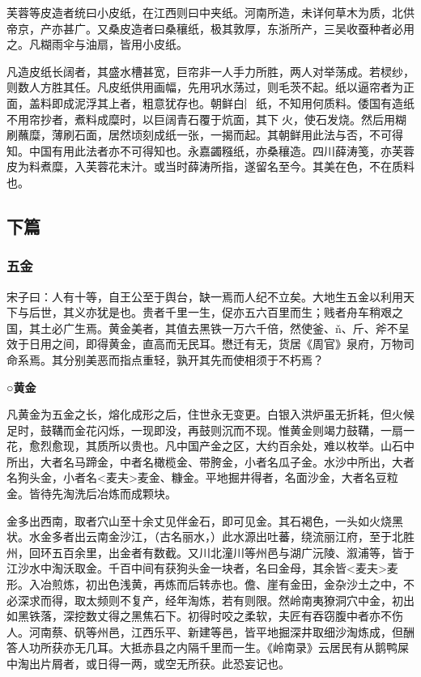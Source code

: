 \documentclass[]{article}
\begin{document}
芙蓉等皮造者统曰小皮纸，在江西则曰中夹纸。河南所造，未详何草木为质，北供帝京，产亦甚广。又桑皮造者曰桑穰纸，极其敦厚，东浙所产，三吴收蚕种者必用之。凡糊雨伞与油扇，皆用小皮纸。

凡造皮纸长阔者，其盛水槽甚宽，巨帘非一人手力所胜，两人对举荡成。若棂纱，则数人方胜其任。凡皮纸供用画幅，先用巩水荡过，则毛茨不起。纸以逼帘者为正面，盖料即成泥浮其上者，粗意犹存也。朝鲜白︴纸，不知用何质料。倭国有造纸不用帘抄者，煮料成糜时，以巨阔青石覆于炕面，其下火，使石发烧。然后用糊刷蘸糜，薄刷石面，居然顷刻成纸一张，一揭而起。其朝鲜用此法与否，不可得知。中国有用此法者亦不可得知也。永嘉蠲糨纸，亦桑穰造。四川薛涛笺，亦芙蓉皮为料煮糜，入芙蓉花末汁。或当时薛涛所指，遂留名至今。其美在色，不在质料也。

\hypertarget{header-n2655}{%
\subsection{下篇}\label{header-n2655}}

\hypertarget{header-n2657}{%
\subsubsection{五金}\label{header-n2657}}

宋子曰：人有十等，自王公至于舆台，缺一焉而人纪不立矣。大地生五金以利用天下与后世，其义亦犹是也。贵者千里一生，促亦五六百里而生；贱者舟车稍艰之国，其土必广生焉。黄金美者，其值去黑铁一万六千倍，然使釜、ň、斤、斧不呈效于日用之间，即得黄金，直高而无民耳。懋迁有无，货居《周官》泉府，万物司命系焉。其分别美恶而指点重轻，孰开其先而使相须于不朽焉？

\textbf{○黄金}

凡黄金为五金之长，熔化成形之后，住世永无变更。白银入洪炉虽无折耗，但火候足时，鼓鞲而金花闪烁，一现即没，再鼓则沉而不现。惟黄金则竭力鼓鞲，一扇一花，愈烈愈现，其质所以贵也。凡中国产金之区，大约百余处，难以枚举。山石中所出，大者名马蹄金，中者名橄榄金、带胯金，小者名瓜子金。水沙中所出，大者名狗头金，小者名\textless{}麦夫\textgreater{}麦金、糠金。平地掘井得者，名面沙金，大者名豆粒金。皆待先淘洗后冶炼而成颗块。

金多出西南，取者穴山至十余丈见伴金石，即可见金。其石褐色，一头如火烧黑状。水金多者出云南金沙江，（古名丽水，）此水源出吐蕃，绕流丽江府，至于北胜州，回环五百余里，出金者有数截。又川北潼川等州邑与湖广沅陵、溆浦等，皆于江沙水中淘沃取金。千百中间有获狗头金一块者，名曰金母，其余皆\textless{}麦夫\textgreater{}麦形。入冶煎炼，初出色浅黄，再炼而后转赤也。儋、崖有金田，金杂沙土之中，不必深求而得，取太频则不复产，经年淘炼，若有则限。然岭南夷獠洞穴中金，初出如黑铁落，深挖数丈得之黑焦石下。初得时咬之柔软，夫匠有吞窃腹中者亦不伤人。河南蔡、矾等州邑，江西乐平、新建等邑，皆平地掘深井取细沙淘炼成，但酬答人功所获亦无几耳。大抵赤县之内隔千里而一生。《岭南录》云居民有从鹅鸭屎中淘出片屑者，或日得一两，或空无所获。此恐妄记也。
\end{document}
